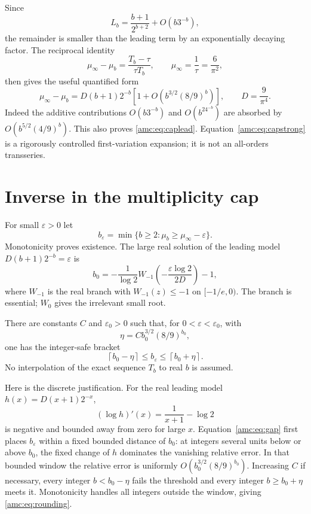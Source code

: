 \documentclass[11pt,letterpaper]{article}
\theoremstyle{remark}\newtheorem{remark}[theorem]{Remark}
\begin{document}
Since
\[
 L_b=\frac{b+1}{2^{b+2}}+O(b3^{-b}),
\]
the remainder is smaller than the leading term by an exponentially decaying factor. The reciprocal identity
\[
 \mu_\infty-\mu_b=\frac{T_b-\tau}{\tau T_b},\qquad\mu_\infty=\frac1\tau=\frac6{\pi^2},
\]
then gives the useful quantified form
\begin{equation}\label{amc:eq:gap}
 \mu_\infty-\mu_b
 =D(b+1)2^{-b}\left[1+O\!\left(b^{3/2}(8/9)^b\right)\right],
 \qquad D=\frac9{\pi^4}.
\end{equation}
Indeed the additive contributions $O(b3^{-b})$ and $O(b^24^{-b})$ are absorbed by $O(b^{5/2}(4/9)^b)$. This also proves \eqref{amc:eq:caplead}. Equation~\eqref{amc:eq:capstrong} is a rigorously controlled first-variation expansion; it is not an all-orders transseries.

\section{Inverse in the multiplicity cap}\label{amc:sec:capinverse}
For small $\varepsilon>0$ let
\[
 b_\varepsilon=\min\{b\ge2:\mu_b\ge\mu_\infty-\varepsilon\}.
\]
Monotonicity proves existence. The large real solution of the leading model
$D(b+1)2^{-b}=\varepsilon$ is
\begin{equation}\label{amc:eq:capinverse}
 b_0=-\frac1{\log2}W_{-1}\!\left(-\frac{\varepsilon\log2}{2D}\right)-1,
\end{equation}
where $W_{-1}$ is the real branch with $W_{-1}(z)\le-1$ on $[-1/e,0)$. The branch is essential; $W_0$ gives the irrelevant small root.

There are constants $C$ and $\varepsilon_0>0$ such that, for $0<\varepsilon<\varepsilon_0$, with
\[
 \eta=C b_0^{3/2}(8/9)^{b_0},
\]
one has the integer-safe bracket
\begin{equation}\label{amc:eq:rounding}
 \left\lceil b_0-\eta\right\rceil
 \le b_\varepsilon\le
 \left\lceil b_0+\eta\right\rceil.
\end{equation}
No interpolation of the exact sequence $T_b$ to real $b$ is assumed.

Here is the discrete justification. For the real leading model $h(x)=D(x+1)2^{-x}$,
\[
 (\log h)'(x)=\frac1{x+1}-\log2
\]
is negative and bounded away from zero for large $x$. Equation~\eqref{amc:eq:gap} first places $b_\varepsilon$ within a fixed bounded distance of $b_0$: at integers several units below or above $b_0$, the fixed change of $h$ dominates the vanishing relative error. In that bounded window the relative error is uniformly $O(b_0^{3/2}(8/9)^{b_0})$. Increasing $C$ if necessary, every integer $b<b_0-\eta$ fails the threshold and every integer $b\ge b_0+\eta$ meets it. Monotonicity handles all integers outside the window, giving \eqref{amc:eq:rounding}.
\end{document}
